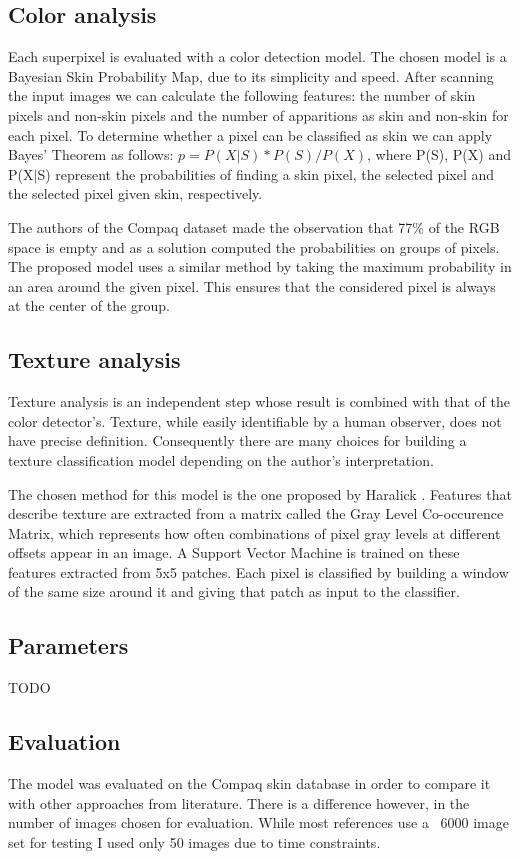 \documentclass[12pt]{article}
\begin{document}
	\subsection{Color analysis}
	Each superpixel is evaluated with a color detection model. The chosen model is a Bayesian Skin Probability Map, due to its simplicity and speed. After scanning the input images we can calculate the following features: the number of skin pixels and non-skin pixels and the number of apparitions as skin and non-skin for each pixel. To determine whether a pixel can be classified as skin we can apply Bayes' Theorem as follows: \(p = P(X|S) * P(S) / P(X)\), where P(S), P(X) and P(X$\vert$S) represent the probabilities of finding a skin pixel, the selected pixel and the selected pixel given skin, respectively.
	
	The authors of the Compaq \cite{compaq} dataset made the observation that 77\% of the RGB space is empty and as a solution computed the probabilities on groups of pixels. The proposed model uses a similar method by taking the maximum probability in an area around the given pixel. This ensures that the considered pixel is always at the center of the group.
	
	\subsection{Texture analysis}
	Texture analysis is an independent step whose result is combined with that of the color detector's. Texture, while easily identifiable by a human observer, does not have precise definition. Consequently there are many choices for building a texture classification model depending on the author's interpretation.
	
	The chosen method for this model is the one proposed by Haralick \cite{haralick_features}. Features that describe texture are extracted from a matrix called the Gray Level Co-occurence Matrix, which represents how often combinations of pixel gray levels at different offsets appear in an image. A Support Vector Machine is trained on these features extracted from 5x5 patches. Each pixel is classified by building a window of the same size around it and giving that patch as input to the classifier.
	
	\subsection{Parameters}
	TODO
	
	\subsection{Evaluation}
	The model was evaluated on the Compaq skin database in order to compare it with other approaches from literature. There is a difference however, in the number of images chosen for evaluation. While most references use a ~6000 image set for testing I used only 50 images due to time constraints.
	
\end{document}
